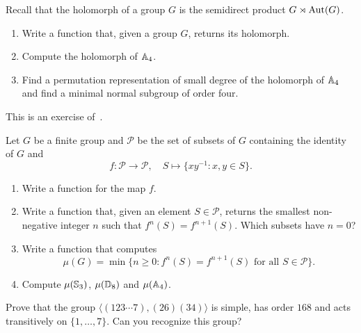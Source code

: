 \begin{prob}
	\label{prob:holA4}
Recall that the holomorph of a group $G$ is the semidirect product $G\rtimes \operatorname{Aut}(G)$.
\begin{enumerate}
\item Write a function that, given a group $G$, returns its holomorph.
\item Compute the holomorph of $\mathbb{A}_4$. 
\item Find a permutation representation 
of small degree of the holomorph of $\mathbb{A}_4$ and find a minimal normal subgroup of order four. 
\end{enumerate}
This is an exercise of~\cite{MR2478410}.
\end{prob}


\begin{prob}
    Let $G$ be a finite group and 
    $\mathcal{P}$ be the set of subsets of $G$ 
    containing the identity of $G$ and 
    \[
    f\colon\mathcal{P}\to\mathcal{P},
    \quad S\mapsto \{xy^{-1}:x,y\in S\}.
    \]
    \begin{enumerate}
        \item Write a function for the map $f$.
        \item Write a function that, given an element $S\in \mathcal{P}$, returns the smallest non-negative integer $n$
            such that $f^n(S)=f^{n+1}(S)$.
            Which subsets have $n = 0$?
        \item Write a function that computes
        \[
        \mu(G)=\min\{n\geq 0:f^n(S)=f^{n+1}(S)\text{ for all $S\in\mathcal{P}$}\}.
        \]
        \item Compute $\mu(\mathbb{S}_3)$, $\mu(\mathbb{D}_8)$ and $\mu(\mathbb{A}_4)$.
    \end{enumerate}
\end{prob}



\begin{prob}
Prove that the group $\langle (123\cdots7),(26)(34)\rangle$ is simple, 
has order $168$ and acts transitively on $\{1,\dots,7\}$.
Can you recognize this group?
\end{prob}

